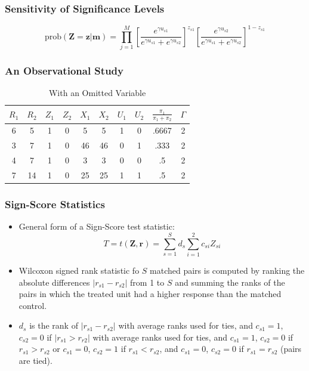 \documentclass{beamer}
\begin{document}
\begin{frame}[c]\frametitle{Sensitivity of Significance Levels}
	
	\[
	\textrm{prob}(\mathbf{Z=z|m}) = \prod_{j=1}^M \left [\frac{e^{\gamma u_{s1}}}{e^{\gamma u_{s1}}+e^{\gamma u_{s2}}}\right ]^{z_{s1}} \left [\frac{e^{\gamma u_{s2}}}{e^{\gamma u_{s1}}+e^{\gamma u_{s2}}}\right ]^{1-z_{s1}} 
	\]
	
\end{frame}

\begin{frame}[c]\frametitle{An Observational Study}
	\begin{table}
		\begin{center}
			\begin{tabular}{cccccccccc}
				$R_1$ & $R_2$ & $Z_1$ & $Z_2$ & $X_1$ & $X_2$ & $U_1$ & $U_2$ & $\frac{\pi_1}{\pi_1 + \pi_2}$ & $\Gamma $\\ \hline
				6 & 5 & 1 & 0 & 5 & 5 & 1 & 0 &  .6667 &2 \\
				3 & 7 & 1 & 0 & 46 & 46 & 0 & 1 & .333 &2 \\
				4 & 7 & 1 & 0 & 3 & 3 & 0 & 0 &  .5 & 2\\
				7 & 14 & 1 & 0 & 25 &25 & 1 & 1 & .5 & 2 \\
			\end{tabular}
		\end{center}
		\caption{With an Omitted Variable}
	\end{table}
\end{frame}


\begin{frame}
  \frametitle{Sign-Score Statistics}
  \begin{itemize}
  \item<+-> General form of a Sign-Score test statistic:
$$ T=t(\mathbf{Z},\mathbf{r})= \sum_{s=1}^Sd_s\sum_{i=1}^2c_{si}Z_{si} $$
\item<+-> Wilcoxon signed rank statistic fo $S$ matched pairs is computed
  by ranking the absolute differences $|r_{s1}-r_{s2}| $ from 1 to $S$
  and summing the ranks of the pairs in which the treated unit had a
  higher response than the matched control. 
\item<+-> $d_s$ is the rank of $|r_{s1}-r_{s2}|$ with average ranks used
  for ties, and $c_{s1}=1$, $c_{s2}=0$ if $|r_{s1}>r_{r2}|$ with
  average ranks used for ties, and $c_{s1}=1$, $c_{s2}=0$ if
  $r_{s1}>r_{s2}$ or $c_{s1}=0$, $c_{s2}=1$ if $r_{s1}<r_{s2}$, and
  $c_{s1}=0$, $c_{s2}=0$ if  $r_{s1}=r_{s2}$ (pairs are tied). 
  \end{itemize}
  \end{frame}
\end{document}
